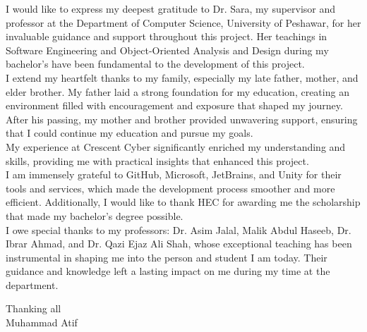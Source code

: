 {}
I would like to express my deepest gratitude to Dr. Sara, my supervisor and professor at the Department of Computer Science, University of Peshawar, for her invaluable guidance and support throughout this project. Her teachings in Software Engineering and Object-Oriented Analysis and Design during my bachelor's have been fundamental to the development of this project.\\

I extend my heartfelt thanks to my family, especially my late father, mother, and elder brother. My father laid a strong foundation for my education, creating an environment filled with encouragement and exposure that shaped my journey. After his passing, my mother and brother provided unwavering support, ensuring that I could continue my education and pursue my goals.\\

My experience at Crescent Cyber significantly enriched my understanding and skills, providing me with practical insights that enhanced this project.\\

I am immensely grateful to GitHub, Microsoft, JetBrains, and Unity for their tools and services, which made the development process smoother and more efficient. Additionally, I would like to thank HEC for awarding me the scholarship that made my bachelor's degree possible.\\

I owe special thanks to my professors: Dr. Asim Jalal, Malik Abdul Haseeb, Dr. Ibrar Ahmad, and Dr. Qazi Ejaz Ali Shah, whose exceptional teaching has been instrumental in shaping me into the person and student I am today. Their guidance and knowledge left a lasting impact on me during my time at the department.\\
\begin{flushright}
	 Thanking all\\
	 Muhammad Atif
\end{flushright}

